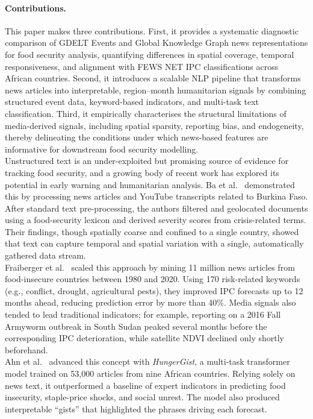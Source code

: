\documentclass{article}
\begin{document}
\paragraph{Contributions.}
This paper makes three contributions. First, it provides a systematic diagnostic comparison of GDELT Events and Global Knowledge Graph news representations for food security analysis, quantifying differences in spatial coverage, temporal responsiveness, and alignment with FEWS NET IPC classifications across African countries. Second, it introduces a scalable NLP pipeline that transforms news articles into interpretable, region--month humanitarian signals by combining structured event data, keyword-based indicators, and multi-task text classification. Third, it empirically characterises the structural limitations of media-derived signals, including spatial sparsity, reporting bias, and endogeneity, thereby delineating the conditions under which news-based features are informative for downstream food security modelling.\\

Unstructured text is an under-exploited but promising source of evidence for tracking food security, and a growing body of recent work has explored its potential in early warning and humanitarian analysis. Ba et al.~\citep{Ba2022} demonstrated this by processing news articles and YouTube transcripts related to Burkina Faso. After standard text pre-processing, the authors filtered and geolocated documents using a food-security lexicon and derived severity scores from crisis-related terms. Their findings, though spatially coarse and confined to a single country, showed that text can capture temporal and spatial variation with a single, automatically gathered data stream. \\

Fraiberger et al.~\citep{Fraiberger2023} scaled this approach by mining 11 million news articles from food-insecure countries between 1980 and 2020. Using 170 risk-related keywords (e.g., conflict, drought, agricultural pests), they improved IPC forecasts up to 12 months ahead, reducing prediction error by more than 40\%. Media signals also tended to lead traditional indicators; for example, reporting on a 2016 Fall Armyworm outbreak in South Sudan peaked several months before the corresponding IPC deterioration, while satellite NDVI declined only shortly beforehand. \\

Ahn et al.~\citep{Ahn2023} advanced this concept with \textit{HungerGist}, a multi-task transformer model trained on 53{,}000 articles from nine African countries. Relying solely on news text, it outperformed a baseline of expert indicators in predicting food insecurity, staple-price shocks, and social unrest. The model also produced interpretable “gists” that highlighted the phrases driving each forecast.\\
\end{document}
